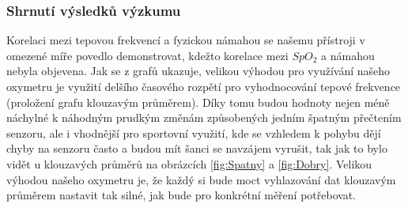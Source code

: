 \subsubsection{Shrnutí výsledků výzkumu}
Korelaci mezi tepovou frekvencí a fyzickou námahou se našemu přístroji v omezené míře povedlo demonstrovat, kdežto korelace mezi $SpO_2$ a námahou nebyla objevena. Jak se z grafů ukazuje, velikou výhodou pro využívání našeho oxymetru je využití delšího časového rozpětí pro vyhodnocování tepové frekvence (proložení grafu klouzavým průměrem). Díky tomu budou hodnoty nejen méně náchylné k náhodným prudkým změnám způsobených jedním špatným přečtením senzoru, ale i vhodnější pro sportovní využití, kde se vzhledem k pohybu dějí chyby na senzoru často a budou mít šanci se navzájem vyrušit, tak jak to bylo vidět u klouzavých průměrů na obrázcích \ref{fig:Spatny} a \ref{fig:Dobry}. Velikou výhodou našeho oxymetru je, že každý si bude moct vyhlazování dat klouzavým průměrem nastavit tak silné, jak bude pro konkrétní měření potřebovat.